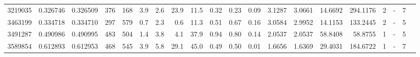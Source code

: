 {\begin{tabular}{rrrrrrrrrrrrrrrrrlrl}
   3219035 & 0.326746 & 0.326509 &  376 &  168 &      3.9 &      2.6 &    23.9 &    11.5 &   0.32 &   0.23 &       0.09 &  3.1287 &  3.0661 &   14.6692 &  294.1176 &       2 &             - &        7  \\
   3463199 & 0.334718 & 0.334710 &  297 &  579 &      0.7 &      2.3 &     0.6 &    11.3 &   0.51 &   0.67 &       0.16 &  3.0584 &  2.9952 &   14.1153 &  133.2445 &       2 &             - &        5  \\
   3491287 & 0.490986 & 0.490995 &  483 &  504 &      1.4 &      3.8 &     4.1 &    37.9 &   0.94 &   0.80 &       0.14 &  2.0537 &  2.0537 &   58.8408 &   58.8755 &       1 &             - &        5  \\
   3589854 & 0.612893 & 0.612953 &  468 &  545 &      3.9 &      5.8 &    29.1 &    45.0 &   0.49 &   0.50 &       0.01 &  1.6656 &  1.6369 &   29.4031 &  184.6722 &       1 &             - &        7  \\
\bottomrule
\end{tabular}%
}
